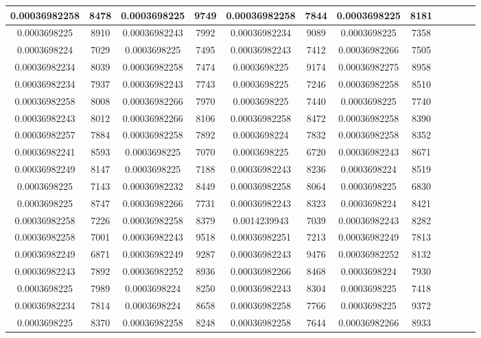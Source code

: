 \begin{table}[h]
\begin{tabular}{|c|c|c|c|c|c|c|c|c|c|c|c|}
\midrule
0.00036982258&8478&0.0003698225&9749&0.00036982258&7844&0.0003698225&8181\\
\midrule
0.0003698225&8910&0.00036982243&7992&0.00036982234&9089&0.0003698225&7358\\
\midrule
0.0003698224&7029&0.0003698225&7495&0.00036982243&7412&0.00036982266&7505\\
\midrule
0.00036982234&8039&0.00036982258&7474&0.0003698225&9174&0.00036982275&8958\\
\midrule
0.00036982234&7937&0.00036982243&7743&0.0003698225&7246&0.00036982258&8510\\
\midrule
0.00036982258&8008&0.00036982266&7970&0.0003698225&7440&0.0003698225&7740\\
\midrule
0.00036982243&8012&0.00036982266&8106&0.00036982258&8472&0.00036982258&8390\\
\midrule
0.00036982257&7884&0.00036982258&7892&0.0003698224&7832&0.00036982258&8352\\
\midrule
0.00036982241&8593&0.0003698225&7070&0.0003698225&6720&0.00036982243&8671\\
\midrule
0.00036982249&8147&0.0003698225&7188&0.00036982243&8236&0.0003698224&8519\\
\midrule
0.0003698225&7143&0.00036982232&8449&0.00036982258&8064&0.0003698225&6830\\
\midrule
0.0003698225&8747&0.00036982266&7731&0.00036982243&8323&0.0003698224&8421\\
\midrule
0.00036982258&7226&0.00036982258&8379&0.0014239943&7039&0.00036982243&8282\\
\midrule
0.00036982258&7001&0.00036982243&9518&0.00036982251&7213&0.00036982249&7813\\
\midrule
0.00036982249&6871&0.00036982249&9287&0.00036982243&9476&0.00036982252&8132\\
\midrule
0.00036982243&7892&0.00036982252&8936&0.00036982266&8468&0.0003698224&7930\\
\midrule
0.0003698225&7989&0.0003698224&8250&0.00036982243&8304&0.0003698225&7418\\
\midrule
0.00036982234&7814&0.0003698224&8658&0.00036982258&7766&0.0003698225&9372\\
\midrule
0.0003698225&8370&0.00036982258&8248&0.00036982258&7644&0.00036982266&8933\\
\midrule
\end{tabular}
    
\end{table}

